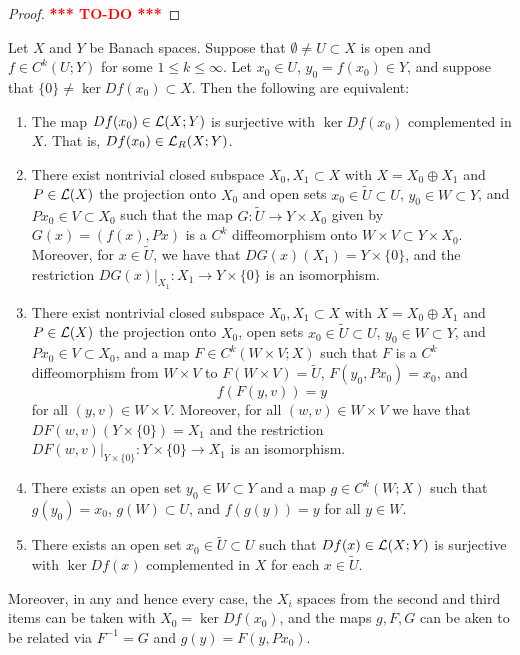 \documentclass[a4paper]{article}
\newcommand{\TODO}{\textcolor{red}{\textbf{*** TO-DO ***}}}
\begin{document}
\begin{proof}
\TODO
\end{proof}

\begin{thm}
Let $X$ and $Y$ be Banach spaces. Suppose that $\emptyset
\neq U \subset X$ is open and $f \in C^k (U ; Y)$ for 
some $1 \leq k \leq \infty$. Let $x_0 \in U$, 
$y_0 = f(x_0) \in Y$, and suppose that $\{0\} \neq
\ker Df(x_0) \subset X$. Then the following
are equivalent:

\begin{enumerate}
\item The map $Df(x_0) \in \mathcal{L}(X; Y)$ is surjective with 
$\ker Df(x_0)$ complemented in $X$. That is, $Df(x_0) 
\in \mathcal{L}_R(X; Y)$. 

\item There exist nontrivial closed subspace $X_0, X_1 
\subset X$ with $X = X_0 \oplus X_1$ and $P \in \mathcal{L}(X)$ 
the projection onto $X_0$ and open sets $x_0 \in \tilde{U} 
\subset U$, $y_0 \in W \subset Y$, and $Px_0 \in V \subset X_0$
such that the map $G : \tilde{U} \to Y \times X_0$ 
given by $G(x) = (f(x), Px)$ is a $C^k$ diffeomorphism 
onto $W \times V \subset Y \times X_0$. Moreover, for $x 
\in \tilde{U}$, we have that $DG(x) (X_1) = Y \times \{0\}$,
and the restriction $DG(x) \vert_{X_1} : X_1 \to Y \times 
\{0\}$ is an isomorphism.

\item There exist nontrivial closed subspace $X_0, X_1 \subset
X$ with $X = X_0 \oplus X_1$ and $P \in \mathcal{L}(X)$ the projection
onto $X_0$, open sets $x_0 \in \tilde{U} \subset U$, 
$y_0 \in W \subset Y$, and $P x_0 \in V \subset X_0$, and 
a map $F \in C^k (W \times V ; X)$ such that $F$ is a 
$C^k$ diffeomorphism from $W \times V$ to $F(W \times V) 
= \tilde{U}$, $F(y_0, Px_0) = x_0$, and 
\[
f(F(y, v)) = y
\]
for all $(y, v) \in W \times V$. Moreover, for all 
$(w, v) \in W \times V$ we have that $DF(w, v) (Y \times
\{0\}) = X_1$ and the restriction $DF(w, v) \vert_{Y \times
\{0\}} : Y \times \{0\} \to X_1$ is an isomorphism.

\item There exists an open set $y_0 \in W \subset Y$ and 
a map $g \in C^k(W; X)$ such that $g(y_0) = x_0$, $g(W) 
\subset U$, and $f(g(y)) = y$ for all $y \in W$.

\item There exists an open set $x_0 \in \tilde{U} \subset U$
such that $Df(x) \in \mathcal{L}(X; Y)$ is surjective with 
$\ker Df(x)$ complemented in $X$ for each $x \in \tilde{U}$.
\end{enumerate}
Moreover, in any and hence every case, the $X_i$ spaces 
from the second and third items can be taken with $X_0 
= \ker Df(x_0)$, and the maps $g, F, G$ can be aken to be 
related via $F^{-1} = G$ and $g(y) = F(y, P x_0)$.
\end{thm}
\end{document}
